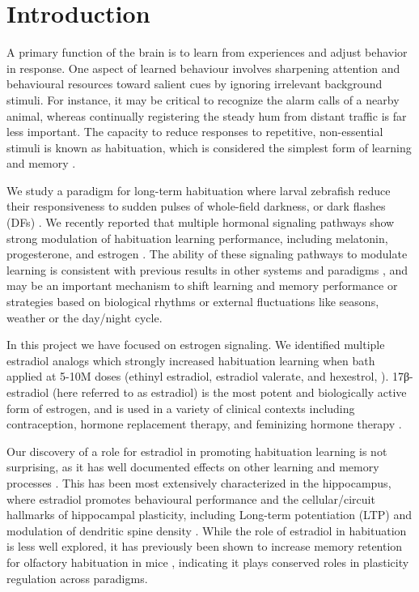 \documentclass[9.5pt,lineno]{RandlettLab_elife}
\begin{document}
\section{Introduction}

A primary  function of the brain is to learn from experiences and adjust behavior in response. 
One aspect of learned behaviour involves sharpening attention and behavioural resources toward salient cues by ignoring irrelevant background stimuli. 
For instance, it may be critical to recognize the alarm calls of a nearby animal, whereas continually registering the steady hum from distant traffic is far less important. 
The capacity to reduce responses to repetitive, non-essential stimuli is known as habituation, which is considered the simplest form of learning and memory \citep{Rankin2009-no}. 

We study a paradigm for long-term habituation where larval zebrafish reduce their responsiveness to sudden pulses of whole-field darkness, or dark flashes (DFs) \citep{wolman_chemical_2011, Randlett2019-fj, Lamire2023-he}. 
We recently reported that multiple hormonal signaling pathways show strong modulation of habituation learning performance, including melatonin, progesterone, and estrogen \citep{Lamire2023-he}. 
The ability of these signaling pathways to modulate learning is consistent with previous results in other systems and paradigms \citep{Nilsson2002-as, Naderi2020-cg, Dillon2013-rk, Rawashdeh2007-bw, Jilg2019-oy, El-Sherif2003-vt, Barros2015-jm}, and may be an important mechanism to shift learning and memory performance or strategies based on biological rhythms or external fluctuations like seasons, weather or the day/night cycle.

In this project we have focused on estrogen signaling. 
We identified multiple estradiol analogs which strongly increased habituation learning when bath applied at 5-10\textmu M doses (ethinyl estradiol, estradiol valerate, and hexestrol, \citep{Lamire2023-he}).
17β-estradiol (here referred to as estradiol) is the most potent and biologically active form of estrogen, and is used in a variety of clinical contexts including contraception, hormone replacement therapy, and feminizing hormone therapy \citep{Kuhl2005-jz, Unger2016-at, Farkas2022-na}. 

Our discovery of a role for estradiol in promoting habituation learning is not surprising, as it has well documented effects on other learning and memory processes \citep{Frick2015-uy}. 
This has been most extensively characterized in the hippocampus, where estradiol promotes behavioural performance and the cellular/circuit hallmarks of hippocampal plasticity, including Long-term potentiation (LTP) and modulation of dendritic spine density \citep{Iqbal2024-yo, Luine2014-cj, Finney2020-ng, Nilsson2002-as}. 
While the role of estradiol in habituation is less well explored, it has previously been shown to increase memory retention for olfactory habituation in mice \citep{Dillon2013-rk}, indicating it plays conserved roles in plasticity regulation across paradigms.
\end{document}
